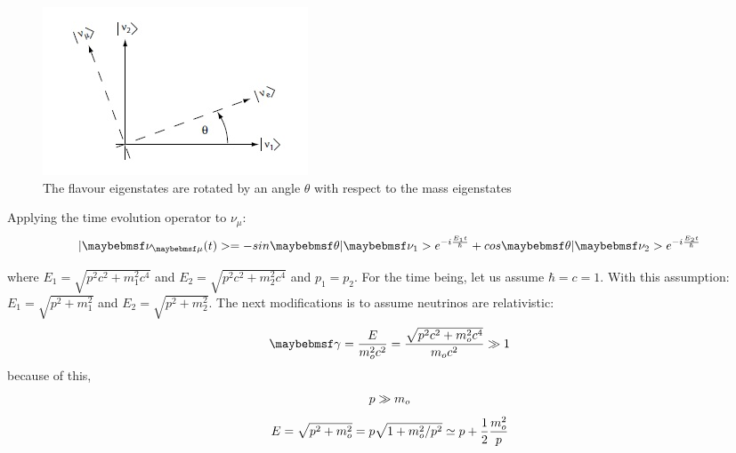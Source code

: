 \begin{figure}[htp]
\centering
\includegraphics[scale=.8]{figs/mixingangle.jpg}
\caption{The flavour eigenstates are rotated by an angle $\theta$ with respect to the mass eigenstates}
\label{fig:mixing}
\end{figure}

Applying the time evolution operator to $\nu_{\mu}$:
\begin{equation}
\centering
\label{eq:timeevol}
|\nu_{\mu}(t)> = -sin\theta|\nu_{1}>e^{-i\frac{E_{1}t}{\hbar}} + cos\theta|\nu_{2}>e^{-i\frac{E_{2}t}{\hbar}}
\end{equation}

where $E_{1} = \sqrt{p^2 c^2 + m^2_{1} c^4}$ and $E_{2} = \sqrt{p^2 c^2 + m^2_{2} c^4}$ and $p_{1}=p_{2}$. For the time being, let us assume $\hbar=c=1$. 
With this assumption:
$E_{1}=\sqrt{p^2+m^2_{1}}$ and $E_{2} = \sqrt{p^2 + m^2_{2}}$.
The next modifications is to assume neutrinos are relativistic:
\begin{equation}
\centering
\label{eq:gamma}
\gamma = \frac{E}{m^2_{o} c^2} = \frac{\sqrt{p^2 c^2 + m^2_{o} c^4}}{m_{o} c^2} \gg 1
\end{equation}
because of this,
\begin{equation}
\centering
p \gg m_{o}
\end{equation}
\begin{equation}
\centering
E = \sqrt{p^2 + m^2_{o}}=p\sqrt{1+m^2_{o}/p^2}\simeq p + \frac{1}{2}\frac{m^2_{o}}{p}
\end{equation}

